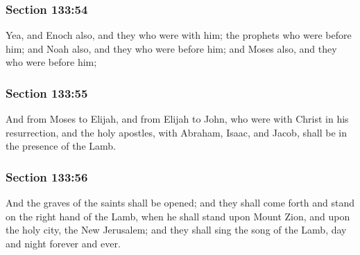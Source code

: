 	\subsubsection{Section 133:54} %
		\label{DC133-54}

		Yea, and Enoch also, and they who were with him; the prophets who were before him; and Noah also, and they who were before him; and Moses also, and they who were before him;


	\subsubsection{Section 133:55} %
		\label{DC133-55}

		And from Moses to Elijah, and from Elijah to John, who were with Christ in his resurrection, and the holy apostles, with Abraham, Isaac, and Jacob, shall be in the presence of the Lamb.


	\subsubsection{Section 133:56} %
		\label{DC133-56}

		And the graves of the saints shall be opened; and they shall come forth and stand on the right hand of the Lamb, when he shall stand upon Mount Zion, and upon the holy city, the New Jerusalem; and they shall sing the song of the Lamb, day and night forever and ever.


